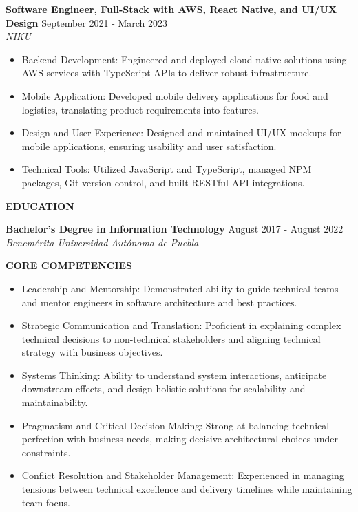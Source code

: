 \documentclass[11pt,letterpaper]{article}
\newcommand{\sectiontitle}[1]{
  {\large\textbf{#1}}
  \vspace{3pt}
}
\newcommand{\jobtitle}[4]{
  {\textbf{#1}} \hfill {#2} \\
  {\textit{#3}} \hfill {#4} \\
}
\begin{document}
\jobtitle{Software Engineer, Full-Stack with AWS, React Native, and UI/UX Design}{September 2021 - March 2023}{NIKU}{}
\begin{itemize}
  \setlength{\itemsep}{0pt}
  \setlength{\parskip}{3pt}
  \item Backend Development: Engineered and deployed cloud-native solutions using AWS services with TypeScript APIs to deliver robust infrastructure.
  \item Mobile Application: Developed mobile delivery applications for food and logistics, translating product requirements into features.
  \item Design and User Experience: Designed and maintained UI/UX mockups for mobile applications, ensuring usability and user satisfaction.
  \item Technical Tools: Utilized JavaScript and TypeScript, managed NPM packages, Git version control, and built RESTful API integrations.
\end{itemize}
\vspace{8pt}

\sectiontitle{EDUCATION}

\jobtitle{Bachelor's Degree in Information Technology}{August 2017 - August 2022}{Benemérita Universidad Autónoma de Puebla}{}
\vspace{8pt}

\sectiontitle{CORE COMPETENCIES}
\begin{itemize}
  \setlength{\itemsep}{0pt}
  \setlength{\parskip}{3pt}
  \item Leadership and Mentorship: Demonstrated ability to guide technical teams and mentor engineers in software architecture and best practices.
  \item Strategic Communication and Translation: Proficient in explaining complex technical decisions to non-technical stakeholders and aligning technical strategy with business objectives.
  \item Systems Thinking: Ability to understand system interactions, anticipate downstream effects, and design holistic solutions for scalability and maintainability.
  \item Pragmatism and Critical Decision-Making: Strong at balancing technical perfection with business needs, making decisive architectural choices under constraints.
  \item Conflict Resolution and Stakeholder Management: Experienced in managing tensions between technical excellence and delivery timelines while maintaining team focus.
\end{itemize}
\vspace{8pt}
\end{document}
